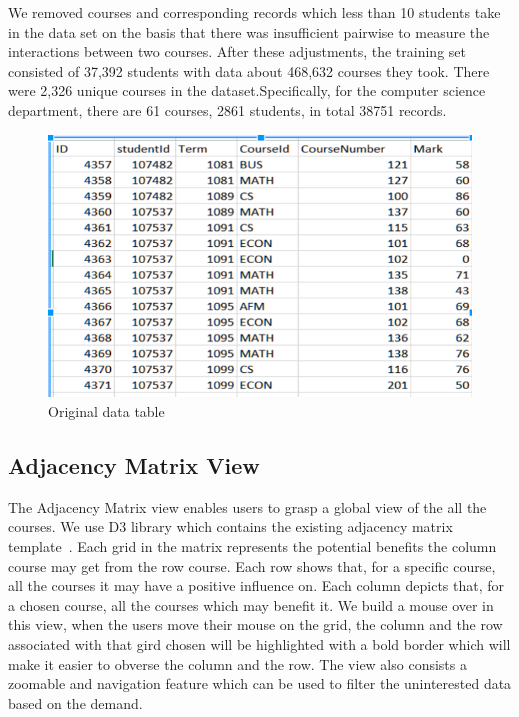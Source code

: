 We removed courses and corresponding records which less than 10 students take in the data set on the basis that there was insufficient pairwise to measure the interactions between two courses. After these adjustments, the training set consisted of 37,392 students with data about 468,632 courses they took. There were 2,326 unique courses in the dataset.Specifically, for the computer science department, there are 61 courses, 2861 students, in total 38751 records.


\begin{figure}[h]
	\centering %
	\includegraphics[width=\columnwidth]{figs/data} 
	\caption{Original data table}
	\label{fig:data}
\end{figure}

\subsection{Adjacency Matrix View}
\label{sec:matrix}
The Adjacency Matrix view enables users to grasp a global view of the all the courses. We use D3 library which contains the existing adjacency matrix template~\cite{Bostock:2011:DDD:2068462.2068631}. Each grid in the matrix represents the potential benefits the column course may get from the row course. Each row shows that, for a specific course, all the courses it may have a positive influence on. Each column depicts that, for a chosen course, all the courses which may benefit it. We build a mouse over in this view, when the users move their mouse on the grid, the column and the row associated with that gird chosen will be highlighted with a bold border which will make it easier to obverse the column and the row. The view also consists a zoomable and navigation feature which can be used to filter the uninterested data based on the demand. 

